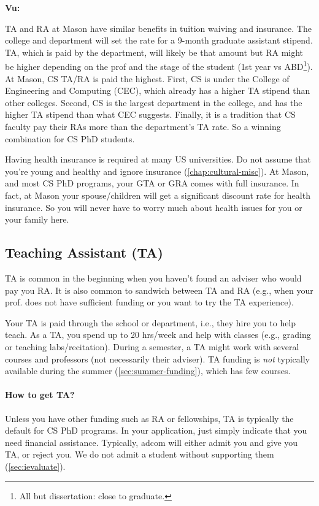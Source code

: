\documentclass[oneside,11pt,dvipsnames]{book}
\newenvironment{commentbox}[1][]{
  \small
  \begin{mybox}
    {\small \textbf{#1}}
  }{
  \end{mybox}
}
\begin{document}
\begin{commentbox}[Vu:]
  TA and RA at Mason have similar benefits in tuition waiving and insurance.  The college and department will set the rate for a 9-month graduate assistant stipend.  TA, which is paid by the department, will likely be that amount but RA might be higher depending on  the prof and the stage of the student (1st year vs ABD\footnote{All but dissertation: close to graduate.}).\\

  At Mason, CS TA/RA is paid the highest.  First, CS is under the College of Engineering and Computing (CEC), which already has a higher TA stipend than other colleges.  Second, CS is the largest department in the college, and has the higher TA stipend than what CEC suggests.  Finally, it is a tradition that CS faculty pay their RAs more than the department's TA rate.  So a winning combination for CS PhD students.
  
  \tcblower
  Having health insurance is required at many US universities.  Do not assume that you're young and healthy and ignore insurance (\autoref{chap:cultural-misc}).  At Mason, and most CS PhD programs, your GTA or GRA comes with full insurance. In fact, at Mason your spouse/children will get a significant discount rate for health insurance.  So you will never have to worry much about health issues for you or your family here.
\end{commentbox}


\subsection{Teaching Assistant (TA)}\label{sec:ta}

TA is common in the beginning when you haven't found an adviser who would pay you RA. It is also common to sandwich between TA and RA (e.g., when your prof. does not have sufficient funding or you want to try the TA experience).

Your TA is paid through the school or department, i.e., they hire you to help teach.
As a TA, you spend up to 20 hrs/week and help with classes (e.g., grading or teaching labs/recitation).
During a semester, a TA might work with several courses and professors (not necessarily their adviser).  TA funding is \emph{not} typically available during the summer (\autoref{sec:summer-funding}), which has few courses.

\paragraph{How to get TA?}  Unless you have other funding such as RA or fellowships, TA is typically the default for CS PhD programs. In your application, just simply indicate that you need financial assistance. Typically, adcom will either admit you and give you TA, or reject you. We do not admit a student without supporting them (\autoref{sec:ievaluate}).
\end{document}

